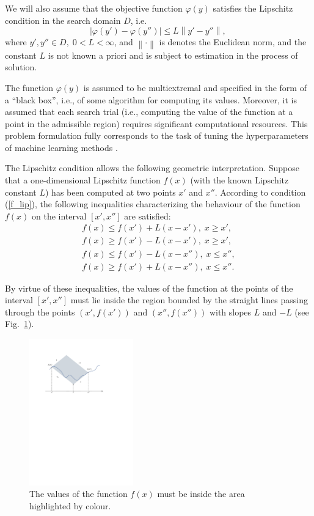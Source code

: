 \documentclass[iicol]{sn-jnl}
\theoremstyle{thmstyleone}%
\theoremstyle{thmstyletwo}%
\theoremstyle{thmstylethree}%
\begin{document}
We will also assume that the objective function $\varphi(y)$ satisfies the Lipschitz condition in the search domain $D$, i.e.
\begin{equation} \label{f_lip}
	\left| \varphi(y')-\varphi(y'') \right| \leq L\left\| y' - y''  \right\| , \,
\end{equation}
where $y',y'' \in D, \; 0<L<\infty$, and $ \left\| \cdot \right\|$ is denotes the Euclidean norm, and the constant $L$ is not known a priori and is subject to estimation in the process of solution. 

The function $\varphi(y)$ is assumed to be multiextremal and specified in the form of a ``black box'', i.e., of some algorithm for computing its values. Moreover, it is assumed that each search trial (i.e., computing the value of the function at a point in the admissible region) requires significant computational resources. This problem formulation fully corresponds to the task of tuning the hyperparameters of machine learning methods \citep{Joy2020,Wang2021}.

The Lipschitz condition allows the following geometric interpretation. Suppose that a one-dimensional Lipschitz function $f(x)$ (with the known Lipschitz constant $L$) has been computed at two points $x'$ and $x''$. According to condition (\ref{f_lip}), the following inequalities characterizing the behaviour of the function $f(x)$ on the interval $[x', x'']$  are satisfied:
\begin{gather*}
	f(x) \leq f(x') + L(x-x'), \; x \geq x',\\
	f(x) \geq f(x') - L(x-x'), \; x \geq x',\\
	f(x) \leq f(x') - L(x-x''), \; x \leq x'',\\
	f(x) \geq f(x') + L(x-x''), \; x \leq x''.
\end{gather*}

  By virtue of these inequalities, the values of the function at the points of the interval $[x', x'']$ must lie inside the region bounded by the straight lines passing through the points $(x', f(x'))$ and $(x'', f(x''))$ with slopes $L$ and $-L$ (see Fig.~\ref{fig1}).

\begin{figure}
\centering
\includegraphics[width=0.4\textwidth]{Fig1.pdf}
\caption{The values of the function $f(x)$ must be inside the area highlighted by colour.} \label{fig1}
\end{figure}
\end{document}
